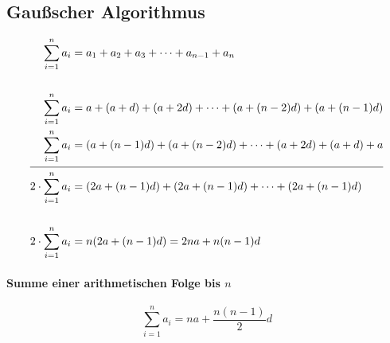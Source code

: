 \subsection{Gaußscher Algorithmus}

\begin{align*}
	\sum_{i=1}^n a_i         & = a_1 + a_2 + a_3 + \cdots + a_{n-1} + a_n                         \\
	\\
	\sum_{i=1}^n a_i         & = a + (a + d) + (a + 2d) + \cdots + (a +(n-2) d) + (a + (n - 1) d) \\
	\sum_{i=1}^n a_i         & = (a + (n-1)d) + (a +(n-2) d) + \cdots + (a + 2d) + (a + d) + a    \\
	\cline{1-2}
	2 \cdot \sum_{i=1}^n a_i & = (2a+(n-1)d) + (2a+(n-1)d) + \cdots + (2a+(n-1)d)                 \\
	\\
	2 \cdot \sum_{i=1}^n a_i & = n (2a+(n-1)d) = 2n a + n(n-1)d
\end{align*}

\begin{gesetz}
	\paragraph{Summe einer arithmetischen Folge bis \(n\)}
	\[
		\sum_{i=1}^n a_i = n a + \frac{n(n-1)}{2} d
	\]
\end{gesetz}
